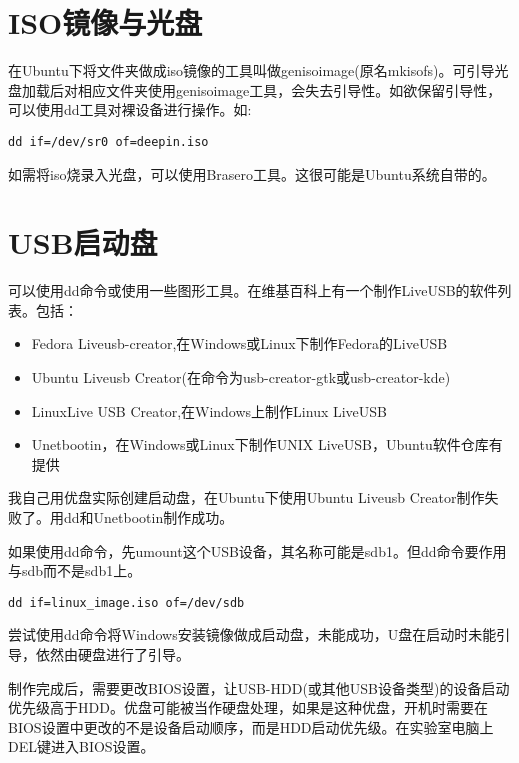 \section{ISO镜像与光盘}
在Ubuntu下将文件夹做成iso镜像的工具叫做genisoimage(原名mkisofs)。可引导光盘加载后对相应文件夹使用genisoimage工具，会失去引导性。如欲保留引导性，可以使用dd工具对裸设备进行操作。如:

\verb+dd if=/dev/sr0 of=deepin.iso+

如需将iso烧录入光盘，可以使用Brasero工具。这很可能是Ubuntu系统自带的。


\section{USB启动盘}

可以使用dd命令或使用一些图形工具。在维基百科上有一个制作LiveUSB的软件列表。包括：
\begin{itemize}
  \item Fedora Liveusb-creator,在Windows或Linux下制作Fedora的LiveUSB
  \item Ubuntu Liveusb Creator(在命令为usb-creator-gtk或usb-creator-kde)
  \item LinuxLive USB Creator,在Windows上制作Linux LiveUSB
  \item Unetbootin，在Windows或Linux下制作UNIX LiveUSB，Ubuntu软件仓库有提供
\end{itemize}
我自己用优盘实际创建启动盘，在Ubuntu下使用Ubuntu Liveusb Creator制作失败了。用dd和Unetbootin制作成功。

如果使用dd命令，先umount这个USB设备，其名称可能是sdb1。但dd命令要作用与sdb而不是sdb1上。
\begin{verbatim}
dd if=linux_image.iso of=/dev/sdb
\end{verbatim}
尝试使用dd命令将Windows安装镜像做成启动盘，未能成功，U盘在启动时未能引导，依然由硬盘进行了引导。

制作完成后，需要更改BIOS设置，让USB-HDD(或其他USB设备类型)的设备启动优先级高于HDD。优盘可能被当作硬盘处理，如果是这种优盘，开机时需要在BIOS设置中更改的不是设备启动顺序，而是HDD启动优先级。在实验室电脑上DEL键进入BIOS设置。


